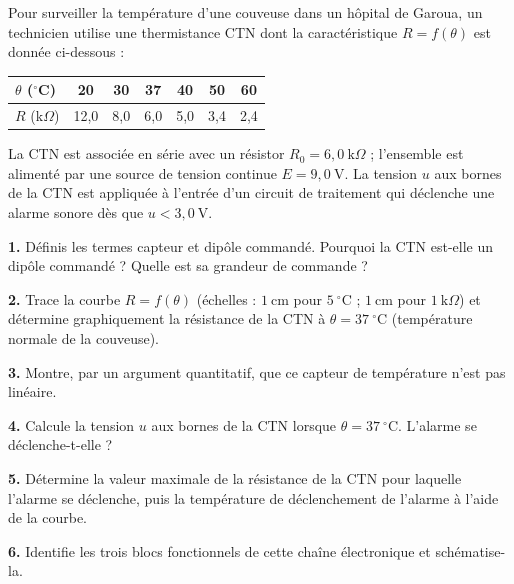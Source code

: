 \documentclass[11pt]{article}
\newcommand{\cle}[1]{{\popxbold\color{popdark}#1}}
\newcounter{popsec}
\newcounter{popsub}
\newcommand{\courssub}[1]{%
  \stepcounter{popsub}%
  \par\vspace{9pt}\noindent{\popxbold\fontsize{11.5}{13}\selectfont\color{popink}{\color{poporange}\thepopsec.\thepopsub}\hspace{6pt}#1}\par\nopagebreak\vspace{4pt}
}
\begin{document}
\courssub{Je me prépare au Bac}

\begin{exercice}
Pour surveiller la température d'une couveuse dans un hôpital de Garoua, un technicien utilise une thermistance CTN dont la caractéristique $R = f(\theta)$ est donnée ci-dessous :

\begin{center}
\begin{tabular}{|l|c|c|c|c|c|c|}
\hline
\rowcolor{popblueL} $\theta$ ($^\circ$C) & 20 & 30 & 37 & 40 & 50 & 60 \\
\hline
$R$ (k$\Omega$) & 12{,}0 & 8{,}0 & 6{,}0 & 5{,}0 & 3{,}4 & 2{,}4 \\
\hline
\end{tabular}
\end{center}

La CTN est associée en série avec un résistor $R_0 = 6{,}0~\text{k}\Omega$ ; l'ensemble est alimenté par une source de tension continue $E = 9{,}0~\text{V}$. La tension $u$ aux bornes de la CTN est appliquée à l'entrée d'un circuit de traitement qui déclenche une alarme sonore dès que $u < 3{,}0~\text{V}$.

\textbf{1.} Définis les termes \cle{capteur} et \cle{dipôle commandé}. Pourquoi la CTN est-elle un dipôle commandé ? Quelle est sa grandeur de commande ?

\textbf{2.} Trace la courbe $R = f(\theta)$ (échelles : $1~\text{cm}$ pour $5~^\circ\text{C}$ ; $1~\text{cm}$ pour $1~\text{k}\Omega$) et détermine graphiquement la résistance de la CTN à $\theta = 37~^\circ\text{C}$ (température normale de la couveuse).

\textbf{3.} Montre, par un argument quantitatif, que ce capteur de température n'est pas linéaire.

\textbf{4.} Calcule la tension $u$ aux bornes de la CTN lorsque $\theta = 37~^\circ\text{C}$. L'alarme se déclenche-t-elle ?

\textbf{5.} Détermine la valeur maximale de la résistance de la CTN pour laquelle l'alarme se déclenche, puis la température de déclenchement de l'alarme à l'aide de la courbe.

\textbf{6.} Identifie les trois blocs fonctionnels de cette chaîne électronique et schématise-la.
\end{exercice}
\end{document}
